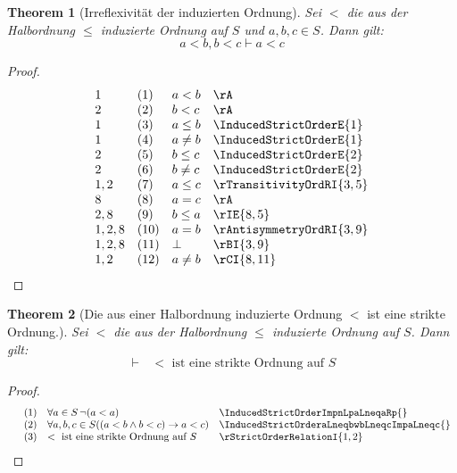 \documentclass{book}
\theoremstyle{plain}
\newtheorem{theorem}{Theorem}
\theoremstyle{remark}
\theoremstyle{definition}
\begin{document}
\label{InducedStrictOrderaLneqbwbLneqcImpaLneqc}
\begin{theorem}[Irreflexivität der induzierten Ordnung]
    Sei \(<\) die aus der Halbordnung \(\leq\) induzierte Ordnung auf \(S\) und \(a,b,c\in S\). Dann gilt:
    \[
    a<b,b<c\vdash a < c
    \]
\end{theorem}
\begin{proof}
	\[
	\begin{array}{llll}
		1     & (1) & a<b & \rA\\
		2     & (2) & b<c & \rA\\
		1     & (3) & a\leq b & \InducedStrictOrderE{1}\\
        1     & (4) & a\neq b & \InducedStrictOrderE{1}\\
        2     & (5) & b\leq c & \InducedStrictOrderE{2}\\
        2     & (6) & b\neq c & \InducedStrictOrderE{2}\\
        1,2   & (7) & a\leq c & \rTransitivityOrdRI{3,5}\\
        8     & (8) & a=c & \rA\\
        2,8   & (9) & b\leq a & \rIE{8,5}\\
        1,2,8 & (10) & a=b & \rAntisymmetryOrdRI{3,9}\\
        1,2,8 & (11) & \bot & \rBI{3,9}\\
        1,2   & (12) & a\neq b & \rCI{8,11}\\
	\end{array}
	\]
\end{proof}

\label{InducedStrictOrderFromHalfOrder}
\begin{theorem}[Die aus einer Halbordnung induzierte Ordnung \(<\) ist eine strikte Ordnung.]
    Sei \(<\) die aus der Halbordnung \(\leq\) induzierte Ordnung auf \(S\). Dann gilt:
    \[
    \vdash \text{ } < \text{ ist eine strikte Ordnung auf }S
    \]
\end{theorem}
\begin{proof}
	\[
        \begin{array}{llll}
          & (1) & \forall a \in S \, \neg (a < a) & \InducedStrictOrderImpnLpaLneqaRp{} \\
          & (2) & \forall a, b, c \in S ((a < b \land b < c) \rightarrow a < c) & \InducedStrictOrderaLneqbwbLneqcImpaLneqc{} \\
          & (3) & < \text{ ist eine strikte Ordnung auf } S & \rStrictOrderRelationI{1,2}
        \end{array}
	\]
\end{proof}
\end{document}
